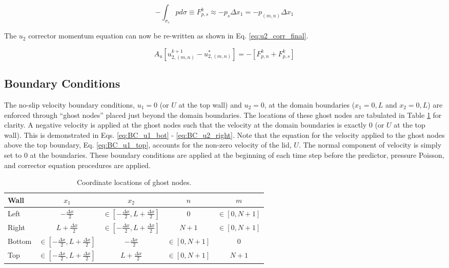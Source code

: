 \documentclass[10pt, letterpaper]{article}
\begin{document}
\begin{equation}
  - \int_{\sigma_{s}}pd\sigma \equiv F_{p,s}^{k} \approx - p_{s}\Delta{x_{1}} = - p_{(m,n)}\Delta{x_{1}}
  \label{eq:u2_Fps}
\end{equation}

The $u_{2}$ corrector momentum equation can now be re-written as shown in Eq. \ref{eq:u2_corr_final}.

\begin{equation}
  \boxed{
  A_{u}[u_{2,(m,n)}^{k+1}-u_{2,(m,n)}^{*}] = - [F_{p,n}^{k} + F_{p,s}^{k}]
  }
  \label{eq:u2_corr_final}
\end{equation}

\subsection{Boundary Conditions}

The no-slip velocity boundary conditions, $u_{1} = 0$ (or $U$ at the top wall) and $u_{2}=0$, at the domain boundaries ($x_{1} = 0, L$ and $x_{2} = 0, L$) are enforced through ``ghost nodes'' placed just beyond the domain boundaries. The locations of these ghost nodes are tabulated in Table \ref{tab:ghost} for clarity. A negative velocity is applied at the ghost nodes such that the velocity at the domain boundaries is exactly $0$ (or $U$ at the top wall). This is demonstrated in Eqs. \ref{eq:BC_u1_bot} - \ref{eq:BC_u2_right}. Note that the equation for the velocity applied to the ghost nodes above the top boundary, Eq. \ref{eq:BC_u1_top}, accounts for the non-zero velocity of the lid, $U$. The normal component of velocity is simply set to 0 at the boundaries. These boundary conditions are applied at the beginning of each time step before the predictor, pressure Poisson, and corrector equation procedures are applied.

\begin{table}
  \begin{center}
    \caption{Coordinate locations of ghost nodes.}
    \begin{tabular}{| l | c | c | c | c | }
      \hline
      Wall & $x_{1}$ & $x_{2}$ & $n$ & $m$ \\ \hline
      Left & $-\frac{\Delta{x}}{2}$ & $ \in [-\frac{\Delta{x}}{2}, L + \frac{\Delta{x}}{2}]$ & $0$ & $\in [0, N+1]$ \\
      Right & $L + \frac{\Delta{x}}{2}$ & $ \in [-\frac{\Delta{x}}{2}, L + \frac{\Delta{x}}{2}]$ & $N+1$ & $\in [0, N+1]$ \\
      Bottom & $ \in [-\frac{\Delta{x}}{2}, L + \frac{\Delta{x}}{2}]$ & $-\frac{\Delta{x}}{2}$ & $\in [0, N+1]$ & $0$ \\
      Top & $ \in [-\frac{\Delta{x}}{2}, L + \frac{\Delta{x}}{2}]$ & $L + \frac{\Delta{x}}{2}$ & $\in [0, N+1]$ & $N+1$ \\ \hline
    \end{tabular}
  \end{center}
  \label{tab:ghost}
\end{table}
\end{document}
